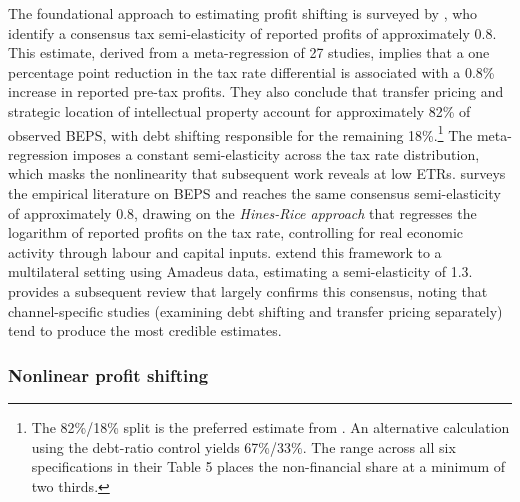 \documentclass[11pt,a4paper]{article}
\begin{document}
The foundational approach to estimating profit shifting is surveyed by \citet{heckemeyer2017}, who identify a consensus tax semi-elasticity of reported profits of approximately 0.8. This estimate, derived from a meta-regression of 27 studies, implies that a one percentage point reduction in the tax rate differential is associated with a 0.8\% increase in reported pre-tax profits. They also conclude that transfer pricing and strategic location of intellectual property account for approximately 82\% of observed BEPS, with debt shifting responsible for the remaining 18\%.\footnote{The 82\%/18\% split is the preferred estimate from \citet{heckemeyer2017}. An alternative calculation using the debt-ratio control yields 67\%/33\%. The range across all six specifications in their Table 5 places the non-financial share at a minimum of two thirds.} The meta-regression imposes a constant semi-elasticity across the tax rate distribution, which masks the nonlinearity that subsequent work reveals at low ETRs. \citet{dharmapala2014} surveys the empirical literature on BEPS and reaches the same consensus semi-elasticity of approximately 0.8, drawing on the \emph{Hines-Rice approach} that regresses the logarithm of reported profits on the tax rate, controlling for real economic activity through labour and capital inputs. \citet{huizinga2008} extend this framework to a multilateral setting using Amadeus data, estimating a semi-elasticity of 1.3. \citet{riedel2018} provides a subsequent review that largely confirms this consensus, noting that channel-specific studies (examining debt shifting and transfer pricing separately) tend to produce the most credible estimates.

\subsubsection{Nonlinear profit shifting}
\end{document}
